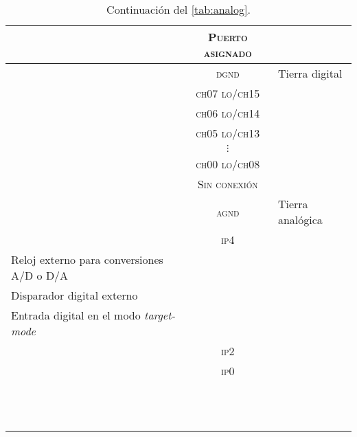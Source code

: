\begin{table}
\begin{tabular}
		\bottomrule
	\end{tabular}
	\caption[Mapa de terminales del conector \emph{analog}]{Relación
	entre los puertos y terminales que presenta el conector trasero de
	la \kpci{} etiquetado como \emph{analog}.}
	\label{tab:analog}
\end{table}

\begin{table}\ContinuedFloat
	\centering
	\begin{tabular}%
		{>{\raggedleft}p{1cm} >{\scshape}c >{\arraybackslash}l}
		\toprule
		\multicolumn{1}{c}{Terminal} & {\upshape Puerto asignado} &
		    \multicolumn{1}{c}{Descripción} \\
		\midrule
		7 & dgnd & Tierra digital \\
		\midrule
		8 & ch07 lo/ch15 & \multirow{5}{\tablewidth}{Entradas
		analógicas, cuya función depende del modo de terminación
		configurado: puerto asociado a un canal monoterminal o
		puerto bajo de un canal diferencial} \\
		9 & ch06 lo/ch14 & \\
		10 & ch05 lo/ch13 & \\
		\multicolumn{1}{c}{$\vdots$} & $\vdots$ & \\
		15 & ch00 lo/ch08 & \\
		\midrule
		16 & {\upshape Sin conexión} & \\
		\midrule
		\multicolumn{1}{l}{17, 18} & agnd & Tierra analógica \\
		\midrule
		19 & ip4 & \multirow{16}{\tablewidth}{Bits digitales de
		entrada multifunción. Pueden ser configurados por el
		usuario para que ejerzan la función de:\miniit{\item Base
		temporal para el contador/temporizador y/o entrada a
		\emph{gate} \\\item Reloj externo para conversiones A/D o
		D/A \\\item Disparador digital externo \\\item Entrada
		digital en el modo \emph{target-mode}}} \\
		20 & ip2 & \\
		21 & ip0 & \\
		\\\\\\\\\\\\\\\\\\\\\\\\
		\bottomrule
	\end{tabular}
	\caption[]{Continuación del \vref{tab:analog}.}
\end{table}

